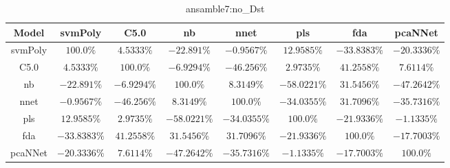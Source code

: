 \begin{table}[!ht]
	\centering
	\begin{tabular}{|c|c|c|c|c|c|c|c|}
		\hline
		Model & svmPoly & C5.0 & nb & nnet & pls & fda & pcaNNet \\ \hline
		svmPoly & $100.0\%$ & $4.5333\%$ & $-22.891\%$ & $-0.9567\%$ & $12.9585\%$ & $-33.8383\%$ & $-20.3336\%$ \\ \hline
		C5.0 & $4.5333\%$ & $100.0\%$ & $-6.9294\%$ & $-46.256\%$ & $2.9735\%$ & $41.2558\%$ & $7.6114\%$ \\ \hline
		nb & $-22.891\%$ & $-6.9294\%$ & $100.0\%$ & $8.3149\%$ & $-58.0221\%$ & $31.5456\%$ & $-47.2642\%$ \\ \hline
		nnet & $-0.9567\%$ & $-46.256\%$ & $8.3149\%$ & $100.0\%$ & $-34.0355\%$ & $31.7096\%$ & $-35.7316\%$ \\ \hline
		pls & $12.9585\%$ & $2.9735\%$ & $-58.0221\%$ & $-34.0355\%$ & $100.0\%$ & $-21.9336\%$ & $-1.1335\%$ \\ \hline
		fda & $-33.8383\%$ & $41.2558\%$ & $31.5456\%$ & $31.7096\%$ & $-21.9336\%$ & $100.0\%$ & $-17.7003\%$ \\ \hline
		pcaNNet & $-20.3336\%$ & $7.6114\%$ & $-47.2642\%$ & $-35.7316\%$ & $-1.1335\%$ & $-17.7003\%$ & $100.0\%$ \\ \hline
	\end{tabular}
	\caption{ansamble7:no_Dst}
	\label{tab:ansamble7:no_Dst}
\end{table}
